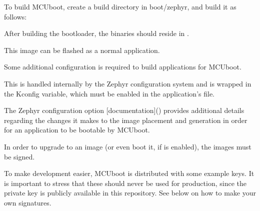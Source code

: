 \documentclass[letterpaper,10pt,english]{sphinxmanual}
\begin{document}
\begin{sphinxVerbatim}[commandchars=\\\{\}]
   
    
\end{sphinxVerbatim}

To build MCUboot, create a build directory in boot/zephyr, and build
it as follows:

\begin{sphinxVerbatim}[commandchars=\\\{\}]
 
    
   
\end{sphinxVerbatim}

After building the bootloader, the binaries should reside in
.

This image can be flashed as a normal application.

Some additional configuration is required to build applications for MCUboot.

This is handled internally by the Zephyr configuration system and is wrapped
in the  Kconfig variable, which must be enabled in
the application’s  file.

The Zephyr  configuration option
{[}documentation{]}()
provides additional details regarding the changes it makes to the image
placement and generation in order for an application to be bootable by
MCUboot.

In order to upgrade to an image (or even boot it, if
 is enabled), the images must be signed.

To make development easier, MCUboot is distributed with some example
keys.  It is important to stress that these should never be used for
production, since the private key is publicly available in this
repository.  See below on how to make your own signatures.
\end{document}
